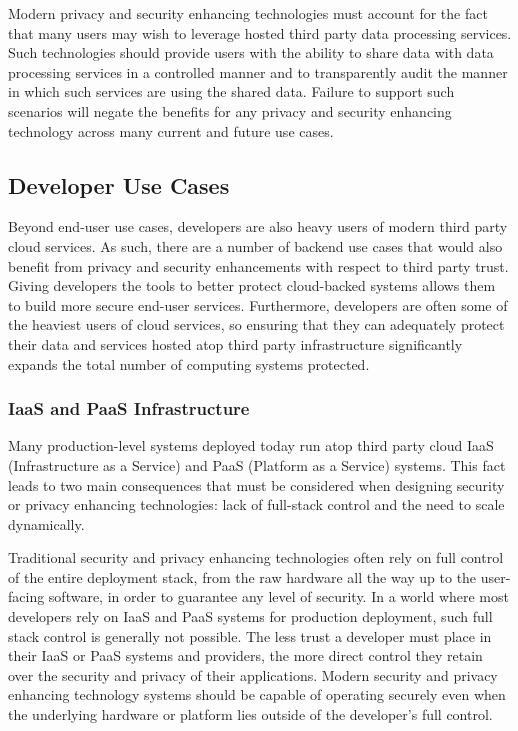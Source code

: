 Modern privacy and security enhancing technologies must account for
the fact that many users may wish to leverage hosted third party data
processing services. Such technologies should provide users with the
ability to share data with data processing services in a controlled
manner and to transparently audit the manner in which such services
are using the shared data. Failure to support such scenarios will
negate the benefits for any privacy and security enhancing technology
across many current and future use cases.

\subsection{Developer Use Cases}

Beyond end-user use cases, developers are also heavy users of modern
third party cloud services. As such, there are a number of backend use
cases that would also benefit from privacy and security enhancements
with respect to third party trust. Giving developers the tools to
better protect cloud-backed systems allows them to build more secure
end-user services. Furthermore, developers are often some of the
heaviest users of cloud services, so ensuring that they can adequately
protect their data and services hosted atop third party infrastructure
significantly expands the total number of computing systems protected.

\subsubsection{IaaS and PaaS Infrastructure}

Many production-level systems deployed today run atop third party
cloud IaaS (Infrastructure as a Service) and PaaS (Platform as a
Service) systems. This fact leads to two main consequences that must
be considered when designing security or privacy enhancing
technologies: lack of full-stack control and the need to scale
dynamically.

Traditional security and privacy enhancing technologies often rely on
full control of the entire deployment stack, from the raw hardware all
the way up to the user-facing software, in order to guarantee any
level of security. In a world where most developers rely on IaaS and
PaaS systems for production deployment, such full stack control is
generally not possible. The less trust a developer must place in their
IaaS or PaaS systems and providers, the more direct control they
retain over the security and privacy of their applications. Modern
security and privacy enhancing technology systems should be capable of
operating securely even when the underlying hardware or platform lies
outside of the developer's full control.

